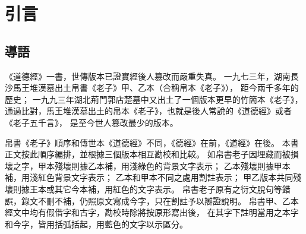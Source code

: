 ﻿%
%

\part*{引言}

\chapter*{導語}

《道德經》一書，世傳版本已證實經後人篡改而嚴重失真。
一九七三年，湖南長沙馬王堆漢墓出土帛書《老子》甲、乙本（合稱帛本《老子》），
距今兩千多年的歷史；
一九九三年湖北荊門郭店楚墓中又出土了一個版本更早的竹簡本《老子》，
通過比對，馬王堆漢墓出土的帛本《老子》，也就是後人常說的《道德經》或者《老子五千言》，
是至今世人篡改最少的版本。

\noindent
帛書《老子》順序和傳世本《道德經》不同，《德經》在前，《道經》在後。
本書正文按此順序編排，並根據三個版本相互勘校和比較。
如帛書老子因埋藏而被損壞之字，甲本殘壞則據乙本補，用淺綠色的背景文字表示；
乙本殘壞則據甲本補，用淺紅色背景文字表示；
乙本和甲本不同之處用割註表示；
甲乙版本共同殘壞則據王本或其它今本補，用紅色的文字表示。
帛書老子原有之衍文脫句等錯誤，錄文不刪不補，仍照原文寫成今字，只在割註予以辯證說明。
帛書甲、乙本經文中均有假借字和古字，勘校時除將按原形寫出後，
在其字下註明當用之本字和今字，皆用括弧括起，用藍色的文字以示區分。
